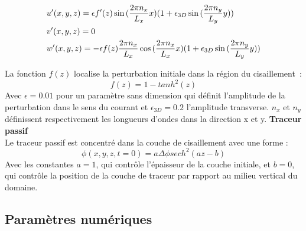 \documentclass[a4paper,12pt]{article}
\begin{document}
    \begin{subequation}
        \begin{align}
        \displaystyle
            \label{u'_ini}
            & u'(x,y,z)=\epsilon f'(z)\sin{(\frac{2\pi n_x}{L_x}x)}(1+\epsilon_{3D}\sin{(\frac{2\pi n_y}{L_y}y)}) \\
            \label{v'_ini}
            & v'(x,y,z)=0 \\
            \label{w'_ini}
            & w'(x,y,z)=-\epsilon f(z)\frac{2\pi n_x}{L_x}\cos{(\frac{2\pi n_x}{L_x}x)}(1+\epsilon_{3D}\sin{(\frac{2\pi n_y}{L_y}y)})
        \end{align}
    \end{subequation}
    La fonction $f(z)$ localise la perturbation initiale dans la région du cisaillement : 
    \begin{equation}
        f(z)=1-tanh^2(z)
    \end{equation}
    Avec $\epsilon=0.01$ pour un paramètre sans dimension qui définit l'amplitude de la perturbation dans le sens du courant et $\epsilon_{3D}=0.2$ l'amplitude transverse. $n_x$ et $n_y$ définissent respectivement les longueurs d'ondes dans la direction x et y. 
    \newline
    \textbf{Traceur passif} \\
    Le traceur passif est concentré dans la couche de cisaillement avec une forme :
    \begin{equation}
    \label{phi_ini}
        \phi(x,y,z,t=0)= a\Delta\phi sech^2(az-b)
    \end{equation}
    Avec les constantes $a=1$, qui contrôle l'épaisseur de la couche initiale, et $b=0$, qui contrôle la position de la couche de traceur par rapport au milieu vertical du domaine. 
    
    \subsection{Paramètres numériques}
    
\end{document}
